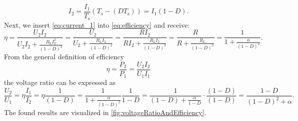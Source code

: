 \begin{solutionblock}
	\begin{equation}
		I_\mathrm{2}= \frac{I_1}{T_\mathrm{s}}(T_\mathrm{s}-(DT_\mathrm{s}))=I_1(1-D) \label{eq:current_1}.
	\end{equation}
	Next, we insert \eqref{eq:current_1} into \eqref{eq:efficiency} and receive:
	\begin{equation}
		\eta=\frac{U_\mathrm{2}I_\mathrm{2}}{U_\mathrm{2}I_\mathrm{2}+\frac{ R_\mathrm{L}I_\mathrm{2}^2}{(1-D)^2}}=\frac{U_\mathrm{2}}{U_\mathrm{2}+\frac{ R_\mathrm{L}I_\mathrm{2}}{(1-D)^2}}=\frac{RI_\mathrm{2}}{RI_\mathrm{2}+\frac{ R_\mathrm{L}I_\mathrm{2}}{(1-D)^2}}=\frac{R}{R+\frac{ R_\mathrm{L}}{(1-D)^2}}=\frac{1}{1+\frac{\alpha}{(1-D)^2}}.
		\label{eq:efficiencyOverD}
	\end{equation}
	From the general definition of efficiency
	\begin{equation}
		\eta=\frac{P_\mathrm{2}}{P_\mathrm{1}} = \frac{U_\mathrm{2}I_\mathrm{2}}{U_\mathrm{1}I_1}
	\end{equation}
	the voltage ratio can be expressed as
	\begin{equation}
		\frac{U_\mathrm{2}}{U_\mathrm{1}}=\eta \frac{I_1}{I_\mathrm{2}}= \eta \frac{1}{(1-D)}=\frac{1}{1+\frac{\alpha}{(1-D)^2}}\frac{1}{1-D}=\frac{1}{(1-D)+\frac{\alpha}{1-D}}\cdot \frac{(1-D)}{(1-D)}=\frac{1-D}{(1-D)^2+\alpha}.
		\label{eq:voltageRatioOverD}
	\end{equation}
	The found results are visualized in \autoref{fig:voltageRatioAndEfficiency}.
	
\end{solutionblock}

